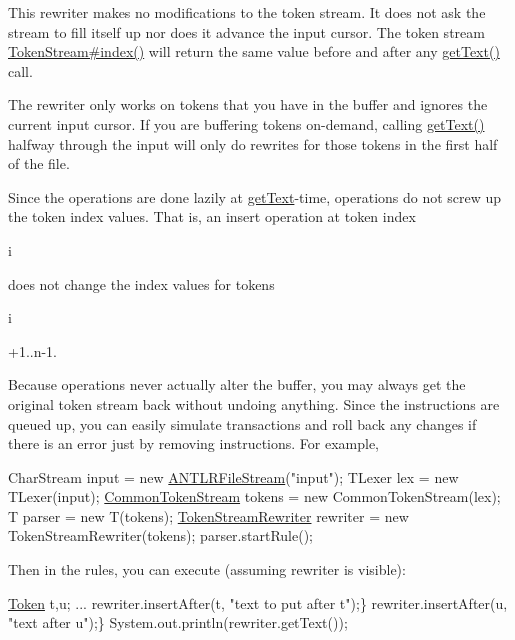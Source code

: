 This rewriter makes no modifications to the token stream. It does not ask the stream to fill itself up nor does it advance the input cursor. The token stream \hyperlink{}{Token\+Stream\#index()} will return the same value before and after any \hyperlink{classantlr4_1_1TokenStreamRewriter_a4c8eb9cc4661e42941c90278caa6fd29}{get\+Text()} call.

The rewriter only works on tokens that you have in the buffer and ignores the current input cursor. If you are buffering tokens on-\/demand, calling \hyperlink{classantlr4_1_1TokenStreamRewriter_a4c8eb9cc4661e42941c90278caa6fd29}{get\+Text()} halfway through the input will only do rewrites for those tokens in the first half of the file.

Since the operations are done lazily at \hyperlink{classantlr4_1_1TokenStreamRewriter_a4c8eb9cc4661e42941c90278caa6fd29}{get\+Text}-\/time, operations do not screw up the token index values. That is, an insert operation at token index
\begin{DoxyCode}
i 
\end{DoxyCode}
 does not change the index values for tokens 
\begin{DoxyCode}
i 
\end{DoxyCode}
 +1..n-\/1.

Because operations never actually alter the buffer, you may always get the original token stream back without undoing anything. Since the instructions are queued up, you can easily simulate transactions and roll back any changes if there is an error just by removing instructions. For example,


\begin{DoxyPre}
CharStream input = new \hyperlink{classantlr4_1_1ANTLRFileStream}{ANTLRFileStream}("input");
TLexer lex = new TLexer(input);
\hyperlink{classantlr4_1_1CommonTokenStream}{CommonTokenStream} tokens = new CommonTokenStream(lex);
T parser = new T(tokens);
\hyperlink{classantlr4_1_1TokenStreamRewriter}{TokenStreamRewriter} rewriter = new TokenStreamRewriter(tokens);
parser.startRule();
\end{DoxyPre}


Then in the rules, you can execute (assuming rewriter is visible)\+:


\begin{DoxyPre}
\hyperlink{classantlr4_1_1Token}{Token} t,u;
...
rewriter.insertAfter(t, "text to put after t");\}
rewriter.insertAfter(u, "text after u");\}
System.out.println(rewriter.getText());
\end{DoxyPre}


